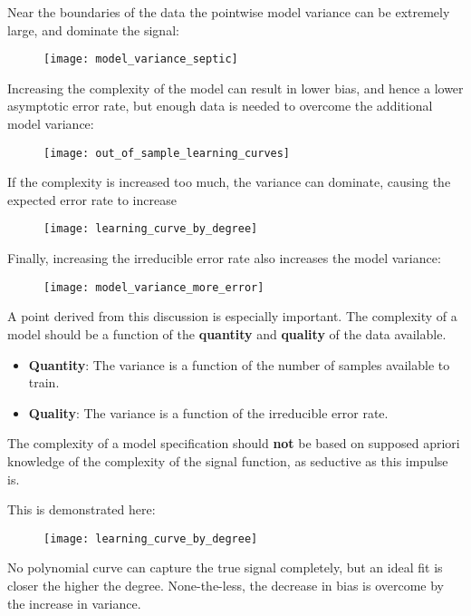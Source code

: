 %
%
\begin{frame}
  Near the boundaries of the data the pointwise model variance can be extremely
  large, and dominate the signal:
  \begin{figure}
    \texttt{[image: model\_variance\_septic]}
  \end{figure}
\end{frame}
%
%
\begin{frame}
  Increasing the complexity of the model can result in lower bias, and hence a
  lower asymptotic error rate, but enough data is needed to overcome the
  additional model variance:
  \begin{figure}
    \texttt{[image: out\_of\_sample\_learning\_curves]}
  \end{figure}
\end{frame}
%
%
\begin{frame}
  If the complexity is increased too much, the variance can dominate, causing
  the expected error rate to increase
  \begin{figure}
    \texttt{[image: learning\_curve\_by\_degree]}
  \end{figure}
\end{frame}
%
%
\begin{frame}
  Finally, increasing the irreducible error rate also increases the model variance:
  \begin{figure}
    \texttt{[image: model\_variance\_more\_error]}
  \end{figure}
\end{frame}
%
%
\begin{frame}
  A point derived from this discussion is especially important.  The complexity
  of a model should be a function of the \textbf{quantity} and \textbf{quality}
  of the data available.
  \begin{itemize}
    \item \textbf{Quantity}: The variance is a function of the number of samples
    available to train.
    \item \textbf{Quality}: The variance is a function of the irreducible error rate.
  \end{itemize}
\end{frame}
%
\begin{frame}
  The complexity of a model specification should \textbf{not} be based on
  supposed apriori knowledge of the complexity of the signal function, as
  seductive as this impulse is.
\end{frame}
%
%
\begin{frame}
  This is demonstrated here:
  \begin{figure}
    \texttt{[image: learning\_curve\_by\_degree]}
  \end{figure}
  No polynomial curve can capture the true signal completely, but an ideal fit
  is closer the higher the degree.  None-the-less, the decrease in bias is
  overcome by the increase in variance.
\end{frame}

